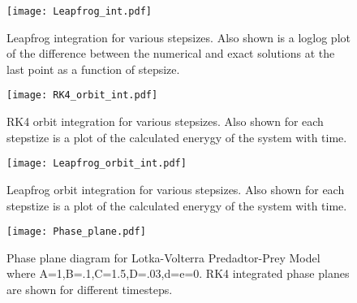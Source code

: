 \documentclass[a4paper,11pt]{article}
\begin{document}
\begin{figure}[h!]
\begin{center}
\texttt{[image: Leapfrog\_int.pdf]}
\caption{Leapfrog integration for various stepsizes.  Also shown is a loglog plot of the difference between the numerical and exact solutions at the last point as a function of stepsize.}
\end{center}
\end{figure}

\begin{figure}[h!]
\begin{center}
\texttt{[image: RK4\_orbit\_int.pdf]}
\caption{RK4 orbit integration for various stepsizes.  Also shown for each stepstize is a plot of the calculated enerygy of the system with time.}
\end{center}
\end{figure}

\begin{figure}[h!]
\begin{center}
\texttt{[image: Leapfrog\_orbit\_int.pdf]}
\caption{Leapfrog orbit integration for various stepsizes.  Also shown for each stepstize is a plot of the calculated enerygy of the system with time.}
\end{center}
\end{figure}


\begin{figure}[h!]
\begin{center}
\texttt{[image: Phase\_plane.pdf]}
\caption{Phase plane diagram for Lotka-Volterra Predadtor-Prey Model where A=1,B=.1,C=1.5,D=.03,d=e=0.  RK4 integrated phase planes are shown for different timesteps.}
\end{center}
\end{figure}
\end{document}
